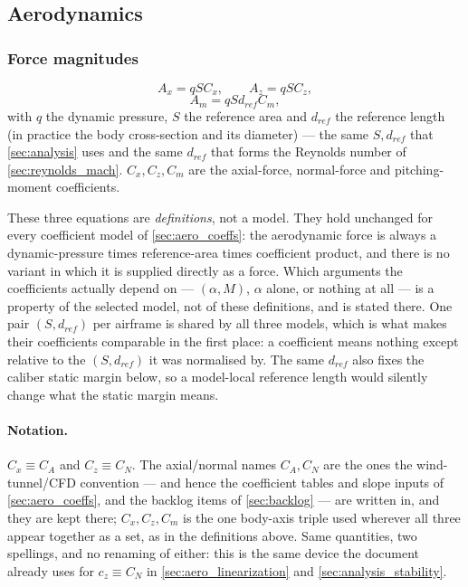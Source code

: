 \subsection{Aerodynamics}\label{sec:aero}
\subsubsection{Force magnitudes}
\begin{equation}
    A_x = qSC_x, \qquad A_z = qSC_z,
\end{equation}
\begin{equation} \label{eq:aero_magnitudes}
    A_m = qSd_{ref}C_m,
\end{equation}
with $q$ the dynamic pressure, $S$ the reference area and $d_{ref}$ the reference length (in
practice the body cross-section and its diameter) --- the same $S,d_{ref}$ that
\autoref{sec:analysis} uses and the same $d_{ref}$ that forms the Reynolds number of
\autoref{sec:reynolds_mach}. $C_x,C_z,C_m$ are the axial-force, normal-force and pitching-moment
coefficients.

These three equations are \emph{definitions}, not a model. They hold unchanged for every
coefficient model of \autoref{sec:aero_coeffs}: the aerodynamic force is always a dynamic-pressure
times reference-area times coefficient product, and there is no variant in which it is supplied
directly as a force. Which arguments the coefficients actually depend on --- $(\alpha,M)$, $\alpha$
alone, or nothing at all --- is a property of the selected model, not of these definitions, and is
stated there. One pair $(S,d_{ref})$ per airframe is shared by all three models, which is what
makes their coefficients comparable in the first place: a coefficient means nothing except relative
to the $(S,d_{ref})$ it was normalised by. The same $d_{ref}$ also fixes the caliber static margin
below, so a model-local reference length would silently change what the static margin means.

\paragraph{Notation.} $C_x\equiv C_A$ and $C_z\equiv C_N$. The axial/normal names $C_A,C_N$ are the
ones the wind-tunnel/CFD convention --- and hence the coefficient tables and slope inputs of
\autoref{sec:aero_coeffs}, and the backlog items of \autoref{sec:backlog} --- are written in, and
they are kept there; $C_x,C_z,C_m$ is the one body-axis triple used wherever all three appear
together as a set, as in the definitions above. Same quantities, two spellings, and no renaming of
either: this is the same device the document already uses for $c_z\equiv C_N$ in
\autoref{sec:aero_linearization} and \autoref{sec:analysis_stability}.

